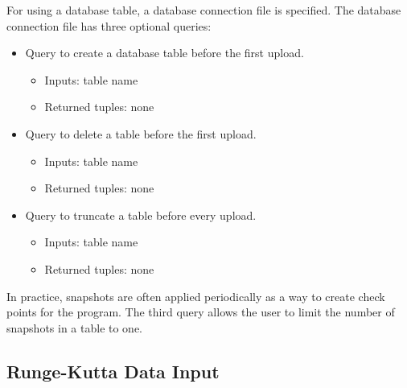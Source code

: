 \documentclass[12pt]{article}
\begin{document}
For using a database table, a database connection file is specified. The database connection file has three optional queries:
\begin{itemize}
  \item Query to create a database table before the first upload.
  \begin{itemize}
   \item Inputs: table name
   \item Returned tuples: none
  \end{itemize}
  \item Query to delete a table before the first upload.
  \begin{itemize}
   \item Inputs: table name
   \item Returned tuples: none
  \end{itemize}
  \item Query to truncate a table before every upload.
  \begin{itemize}
   \item Inputs: table name
   \item Returned tuples: none
  \end{itemize}
\end{itemize}
In practice, snapshots are often applied periodically as a way to create check points for the program. The third query allows the user to limit the number of snapshots in a table to one.


\subsection{Runge-Kutta Data Input} \label{sec: runge-kutta data files input}
\end{document}
